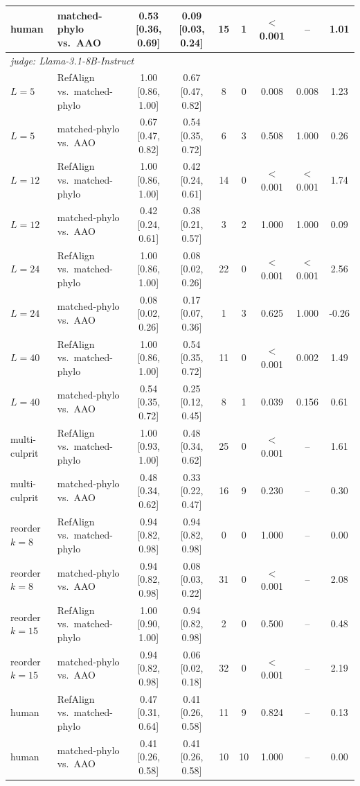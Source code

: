 \begin{table}[t]
\begin{tabular}{llccccccc}
human & matched-phylo vs.\ AAO & 0.53 [0.36, 0.69] & 0.09 [0.03, 0.24] & 15 & 1 & $<$0.001 & -- & 1.01 \\
\midrule
\multicolumn{9}{l}{\emph{judge: Llama-3.1-8B-Instruct}} \\
$L{=}5$ & RefAlign vs.\ matched-phylo & 1.00 [0.86, 1.00] & 0.67 [0.47, 0.82] & 8 & 0 & 0.008 & 0.008 & 1.23 \\
$L{=}5$ & matched-phylo vs.\ AAO & 0.67 [0.47, 0.82] & 0.54 [0.35, 0.72] & 6 & 3 & 0.508 & 1.000 & 0.26 \\
$L{=}12$ & RefAlign vs.\ matched-phylo & 1.00 [0.86, 1.00] & 0.42 [0.24, 0.61] & 14 & 0 & $<$0.001 & $<$0.001 & 1.74 \\
$L{=}12$ & matched-phylo vs.\ AAO & 0.42 [0.24, 0.61] & 0.38 [0.21, 0.57] & 3 & 2 & 1.000 & 1.000 & 0.09 \\
$L{=}24$ & RefAlign vs.\ matched-phylo & 1.00 [0.86, 1.00] & 0.08 [0.02, 0.26] & 22 & 0 & $<$0.001 & $<$0.001 & 2.56 \\
$L{=}24$ & matched-phylo vs.\ AAO & 0.08 [0.02, 0.26] & 0.17 [0.07, 0.36] & 1 & 3 & 0.625 & 1.000 & -0.26 \\
$L{=}40$ & RefAlign vs.\ matched-phylo & 1.00 [0.86, 1.00] & 0.54 [0.35, 0.72] & 11 & 0 & $<$0.001 & 0.002 & 1.49 \\
$L{=}40$ & matched-phylo vs.\ AAO & 0.54 [0.35, 0.72] & 0.25 [0.12, 0.45] & 8 & 1 & 0.039 & 0.156 & 0.61 \\
multi-culprit & RefAlign vs.\ matched-phylo & 1.00 [0.93, 1.00] & 0.48 [0.34, 0.62] & 25 & 0 & $<$0.001 & -- & 1.61 \\
multi-culprit & matched-phylo vs.\ AAO & 0.48 [0.34, 0.62] & 0.33 [0.22, 0.47] & 16 & 9 & 0.230 & -- & 0.30 \\
reorder $k{=}8$ & RefAlign vs.\ matched-phylo & 0.94 [0.82, 0.98] & 0.94 [0.82, 0.98] & 0 & 0 & 1.000 & -- & 0.00 \\
reorder $k{=}8$ & matched-phylo vs.\ AAO & 0.94 [0.82, 0.98] & 0.08 [0.03, 0.22] & 31 & 0 & $<$0.001 & -- & 2.08 \\
reorder $k{=}15$ & RefAlign vs.\ matched-phylo & 1.00 [0.90, 1.00] & 0.94 [0.82, 0.98] & 2 & 0 & 0.500 & -- & 0.48 \\
reorder $k{=}15$ & matched-phylo vs.\ AAO & 0.94 [0.82, 0.98] & 0.06 [0.02, 0.18] & 32 & 0 & $<$0.001 & -- & 2.19 \\
human & RefAlign vs.\ matched-phylo & 0.47 [0.31, 0.64] & 0.41 [0.26, 0.58] & 11 & 9 & 0.824 & -- & 0.13 \\
human & matched-phylo vs.\ AAO & 0.41 [0.26, 0.58] & 0.41 [0.26, 0.58] & 10 & 10 & 1.000 & -- & 0.00 \\

\end{tabular}
\end{table}
